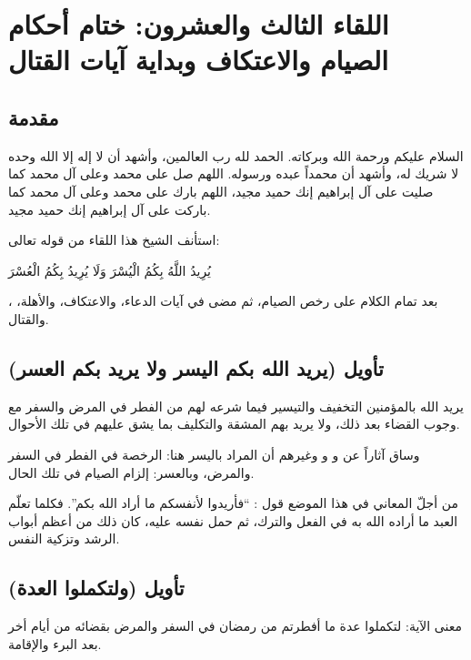 \chapter{اللقاء الثالث والعشرون: ختام أحكام الصيام والاعتكاف وبداية آيات القتال}

\section{مقدمة}
السلام عليكم ورحمة الله وبركاته. الحمد لله رب العالمين، وأشهد أن لا إله إلا الله وحده لا شريك له، وأشهد أن محمداً عبده ورسوله. اللهم صل على محمد وعلى آل محمد كما صليت على آل إبراهيم إنك حميد مجيد، اللهم بارك على محمد وعلى آل محمد كما باركت على آل إبراهيم إنك حميد مجيد.

استأنف الشيخ هذا اللقاء من قوله تعالى: \begin{ayah}يُرِيدُ اللَّهُ بِكُمُ الْيُسْرَ وَلَا يُرِيدُ بِكُمُ الْعُسْرَ\end{ayah}، بعد تمام الكلام على رخص الصيام، ثم مضى في آيات الدعاء، والاعتكاف، والأهلة، والقتال.

\separator

\section{تأويل (يريد الله بكم اليسر ولا يريد بكم العسر)}
 يريد الله بالمؤمنين التخفيف والتيسير فيما شرعه لهم من الفطر في المرض والسفر مع وجوب القضاء بعد ذلك، ولا يريد بهم المشقة والتكليف بما يشق عليهم في تلك الأحوال.

وساق  آثاراً عن  و و وغيرهم أن المراد باليسر هنا: الرخصة في الفطر في السفر والمرض، وبالعسر: إلزام الصيام في تلك الحال.

\begin{fawaid}
من أجلّ المعاني في هذا الموضع قول : ``فأريدوا لأنفسكم ما أراد الله بكم''. فكلما تعلّم العبد ما أراده الله به في الفعل والترك، ثم حمل نفسه عليه، كان ذلك من أعظم أبواب الرشد وتزكية النفس.
\end{fawaid}

\separator

\section{تأويل (ولتكملوا العدة)}
 معنى الآية: لتكملوا عدة ما أفطرتم من رمضان في السفر والمرض بقضائه من أيام أخر بعد البرء والإقامة.

